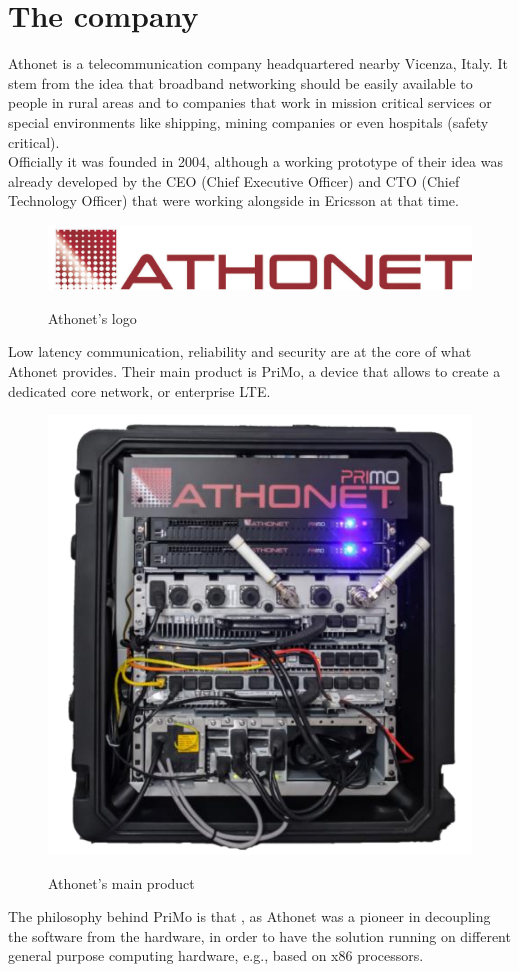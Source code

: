 \section{The company}
	Athonet\cite{athonet} is a telecommunication company headquartered nearby Vicenza, Italy.
	It stem from the idea that broadband networking should be easily available to people in rural areas and to companies that work in mission critical services or special environments like shipping, mining companies or even hospitals (safety critical).\\
	Officially it was founded in 2004, although a working prototype of their idea was already developed by the CEO (Chief Executive Officer) and CTO (Chief Technology Officer) that were working alongside in Ericsson\cite{ericsson} at that time.
	\begin{figure}[H]
		\centering
		\includegraphics[width=.7\textwidth]{resources/ath_logo}\\
		\caption[Athonet's logo]{Athonet's logo}
	\end{figure}
	Low latency communication, reliability and security are at the core of what Athonet provides.
	Their main product is PriMo, a device that allows to create a dedicated core network, or enterprise LTE.
	\begin{figure}[H]
		\centering
		\includegraphics[width=.5\textwidth]{resources/gianluca_primo}\\
		\caption[]{Athonet's main product \textbf{}\cite{gianluca_primo}}
	\end{figure}
	The philosophy behind PriMo is that , as Athonet was a pioneer in decoupling the software from the hardware, in order to have the solution running on different general purpose computing hardware, e.g., based on x86 processors.\\
